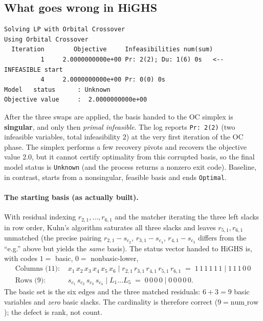 \documentclass[11pt]{article}
\newcommand{\slack}[1]{s_{#1}}
\begin{document}
\subsection*{What goes wrong in HiGHS}

\begin{verbatim}
Solving LP with Orbital Crossover
Using Orbital Crossover
  Iteration        Objective     Infeasibilities num(sum)
          1     2.0000000000e+00 Pr: 2(2); Du: 1(6) 0s   <-- INFEASIBLE start
          4     2.0000000000e+00 Pr: 0(0) 0s
Model   status      : Unknown
Objective value     :  2.0000000000e+00
\end{verbatim}

After the three swaps are applied, the basis handed to the OC simplex is
\textbf{singular}, and only then \emph{primal infeasible}. The log reports
\texttt{Pr: 2(2)} (two infeasible variables, total infeasibility $2$) at the very
first iteration of the OC phase. The simplex performs a few recovery pivots and
recovers the objective value $2.0$, but it cannot certify optimality from this
corrupted basis, so the final model status is \texttt{Unknown} (and the process
returns a nonzero exit code). Baseline, in contrast, starts from a nonsingular,
feasible basis and ends \texttt{Optimal}.

\paragraph{The starting basis (as actually built).}
With residual indexing $r_{2,1},\dots,r_{6,1}$ and the matcher iterating the
three left slacks in row order, Kuhn's algorithm saturates all three slacks and
leaves $r_{5,1},r_{6,1}$ unmatched (the precise pairing
$r_{2,1}\!-\!\slack{c_2}$, $r_{3,1}\!-\!\slack{c_4}$, $r_{4,1}\!-\!\slack{c_3}$
differs from the ``e.g.'' above but yields the \emph{same} basis). The status
vector handed to HiGHS is, with codes $1=$ basic, $0=$ nonbasic-lower,
\[
\begin{aligned}
\text{Columns (11): }& x_1\,x_2\,x_3\,x_4\,x_5\,x_6 \mid r_{2,1}\,r_{3,1}\,r_{4,1}\,r_{5,1}\,r_{6,1}
   \;=\; 1\,1\,1\,1\,1\,1 \mid 1\,1\,1\,0\,0\\
\text{Rows (9): }& \slack{c_1}\,\slack{c_2}\,\slack{c_3}\,\slack{c_4} \mid L_1\dots L_5
   \;=\; 0\,0\,0\,0 \mid 0\,0\,0\,0\,0 .
\end{aligned}
\]
The basic set is the six edges and the three matched residuals: $6+3=9$ basic
variables and \emph{zero} basic slacks. The cardinality is therefore correct
($9 = \text{num\_row}$); the defect is rank, not count.
\end{document}
